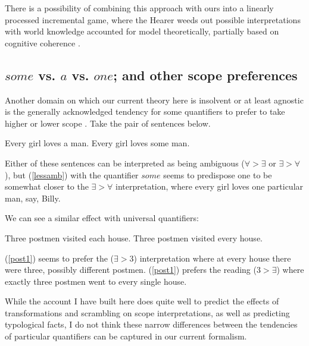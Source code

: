 \documentclass{article}
\begin{document}
There is a possibility of combining this approach with ours into a linearly processed incremental game, where the Hearer weeds out possible interpretations with world knowledge accounted for model theoretically, partially based on cognitive coherence \parencite{langacker87}.

\subsection{$some$ vs. $a$ vs. $one$; and other scope preferences}

Another domain on which our current theory here is insolvent or at least agnostic is the generally acknowledged tendency for some quantifiers to prefer to take higher or lower scope \parencite{feiman16}. Take the pair of sentences below.

\begin{exe}
	\ex \begin{xlist}
	\ex Every girl loves a man.
	\ex Every girl loves some man.\label{lessamb}
	\end{xlist}
\end{exe}

Either of these sentences can be interpreted as being ambiguous (${\forall}>{\exists}$ or ${\exists}>{\forall}$), but (\ref{lessamb}) with the quantifier $some$ seems to predispose one to be somewhat closer to the ${\exists}>{\forall}$ interpretation, where every girl loves one particular man, say, Billy.

We can see a similar effect with universal quantifiers:

\begin{exe}
	\ex \begin{xlist}
		\ex Three postmen visited each house.\label{post1}
		\ex Three postmen visited every house.\label{post2}
	\end{xlist}
\end{exe}

(\ref{post1}) seems to prefer the (${\exists}>3$) interpretation where at every house there were three, possibly different postmen.
(\ref{post1}) prefers the reading ($3>{\exists}$) where exactly three postmen went to every single house.

While the account I have built here does quite well to predict the effects of transformations and scrambling on scope interpretations, as well as predicting typological facts, I do not think these narrow differences between the tendencies of particular quantifiers can be captured in our current formalism.
\end{document}
